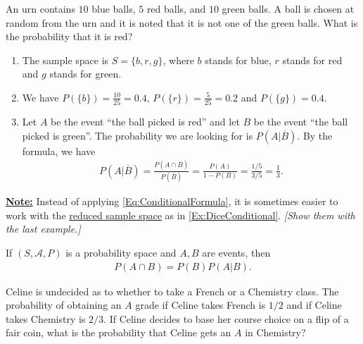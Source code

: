 \begin{example}
An urn contains $10$ blue balls, $5$ red balls, and $10$ green balls. A ball is chosen at random from the urn and it is noted that it is not one of the green balls. What is the probability that it is red?
\end{example}

\begin{sol*}
\begin{enumerate}[label=\Circled{\arabic*}]
\item The sample space is $S = \{ b, r, g \}$, where $b$ stands for blue, $r$ stands for red and $g$ stands for green.
\item We have $P (\{ b \} ) = \frac{10}{25} = 0.4$, $P (\{ r \} ) = \frac{5}{25} = 0.2$ and $P (\{ g \} ) = 0.4$.
\item Let $A$ be the event ``the ball picked is red'' and let $B$ be the event ``the ball picked is green''. The probability we are looking for is $P (A | \overline{B} )$. By the formula, we have
	\begin{align*}
	 P (A | \overline{B}) = \frac{P (A \cap \overline{B})}{P (\overline{B})} = \frac{P (A)}{1 - P (B)} = \frac{1/5}{3/5} = \frac{1}{3} . \tag*{$\triangle$}
	\end{align*}
\end{enumerate}
\end{sol*}

\underline{\textbf{Note:}} Instead of applying \eqref{Eq:ConditionalFormula}, it is sometimes easier to work with the \underline{reduced sample space} as in \cref{Ex:DiceConditional}. \textit{[Show them with the last example.]}

\begin{corollary}\label{Cor:MultiplicationRule}
If $(S, \mathcal{A} , P )$ is a probability space and $A, B$ are events, then
	\begin{align*}
	P (A \cap B ) = P (B) P (A|B ) .
	\end{align*}
\end{corollary}

\begin{example}
Celine is undecided as to whether to take a French or a Chemistry class. The probability of obtaining an $A$ grade if Celine takes French is $1/2$ and if Celine takes Chemistry is $2/3$. If Celine decides to base her course choice on a flip of a fair coin, what is the probability that Celine gets an $A$ in Chemistry?
\end{example}

